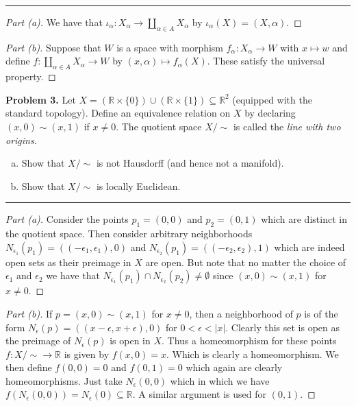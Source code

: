 \documentclass[leqno]{article}
\theoremstyle{nonumberplain}
\newtheorem{proof}{Proof}
\newcommand{\R}{\ensuremath{\mathbb{R}}}
\begin{document}
\noindent\rule[0.5ex]{\linewidth}{1pt}

\begin{proof}[Part (a)]
We have that $\iota_\alpha \colon X_\alpha \to \coprod_{\alpha\in A} X_\alpha$ by $\iota_\alpha (X)=(X,\alpha)$.
\end{proof}

\begin{proof}[Part (b)]
Suppose that $W$ is a space with morphism $f_\alpha \colon X_\alpha \to W$ with $x\mapsto w$ and define $f\colon \coprod_{\alpha \in A} X_\alpha \to W$ by $(x,\alpha)\mapsto f_\alpha(X)$.  These satisfy the universal property.
\end{proof}


\pagebreak




\noindent\textbf{Problem 3.} Let $X=(\R\times \{0\})\cup (\R \times \{1\}) \subseteq \R^2$ (equipped with the standard topology). Define an equivalence relation on $X$ by declaring $(x,0)\sim (x,1)$ if $x\neq 0$. The quotient space $X/\sim$ is called the \emph{line with two origins}.
\begin{enumerate}[(a)]
\item Show that $X/\sim$ is not Hausdorff (and hence not a manifold).
\item Show that $X/\sim$ is locally Euclidean.
\end{enumerate}

\noindent\rule[0.5ex]{\linewidth}{1pt}

\begin{proof}[Part (a)]
Consider the points $p_1=(0,0)$ and $p_2=(0,1)$ which are distinct in the quotient space.  Then consider arbitrary neighborhoods $N_{\epsilon_1}(p_1)=((-\epsilon_1,\epsilon_1),0)$ and $N_{\epsilon_2}(p_1)=((-\epsilon_2,\epsilon_2),1)$ which are indeed open sets as their preimage in $X$ are open.  But note that no matter the choice of $\epsilon_1$ and $\epsilon_2$ we have that $N_{\epsilon_1}(p_1)\cap N_{\epsilon_2}(p_2)\neq \emptyset$ since $(x,0)\sim (x,1)$ for $x\neq 0$.
\end{proof}

\begin{proof}[Part (b)]
If $p=(x,0)\sim (x,1)$ for $x\neq 0$, then a neighborhood of $p$ is of the form $N_\epsilon (p)=((x-\epsilon,x+\epsilon),0)$ for $0<\epsilon<|x|$. Clearly this set is open as the preimage of $N_\epsilon(p)$ is open in $X$.  Thus a homeomorphism for these points $f\colon X/\sim \to \mathbb{R}$  is given by $f(x,0)=x$.  Which is clearly a homeomorphism.  We then define $f(0,0)=0$ and $f(0,1)=0$ which again are clearly homeomorphisms.  Just take $N_\epsilon(0,0)$ which in which we have $f(N_\epsilon(0,0))=N_\epsilon(0)\subseteq \mathbb{R}$.  A similar argument is used for $(0,1)$. 
\end{proof}
\end{document}
